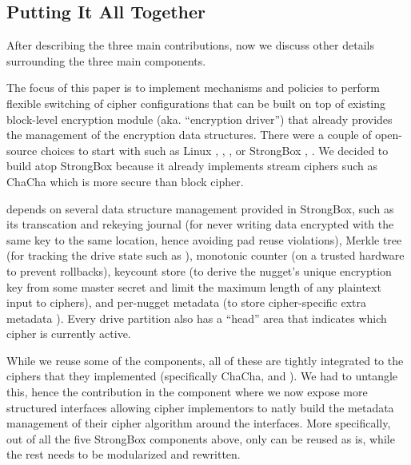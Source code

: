 

\subsection{Putting It All Together} \label{subsec:summary}

After describing the three main contributions, now we discuss
other details surrounding the three main components.


%
The focus of this paper is to implement mechanisms and policies to perform
flexible switching of cipher configurations that can be built on top of
existing block-level encryption module (aka. ``encryption driver'') that
already provides the management of the encryption data structures.  There
were a couple of open-source choices to start with such as Linux
 \cite{x},  \cite{x},
 \cite{y}, 
or StrongBox \cite{x},
.  We decided to build atop StrongBox
because it already implements stream ciphers such as ChaCha which is more
secure than block cipher. 

\sys depends on several data structure management provided in StrongBox,
such as its 
%
transcation and rekeying journal (for never writing data
encrypted with the same key to the same location, hence avoiding pad reuse
violations), 
%
Merkle tree (for tracking the drive state such as
), 
%
monotonic counter (on a trusted hardware to
prevent rollbacks), 
%
keycount store (to derive the nugget's unique
encryption key from some master secret and limit the maximum length of any
plaintext input to ciphers), and 
%
per-nugget metadata (to store cipher-specific extra metadata
).  Every drive partition also has a ``head'' area that
indicates which cipher is currently active.

While we reuse some of the components, all of these are tightly integrated
to the ciphers that they implemented (specifically ChaCha, and \xxx).  We
had to untangle this, hence the contribution in the \sysB component where
we now expose more structured interfaces allowing cipher implementors to
natly build the metadata management of their cipher algorithm around the
interfaces.  More specifically, out of all the five  StrongBox
components above, only \xxx can be reused as is, while the rest needs to
be modularized and rewritten.


